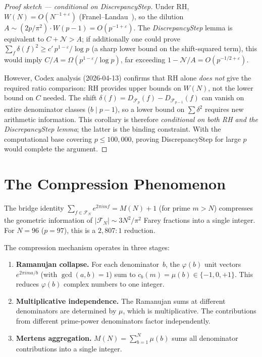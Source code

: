 \documentclass[11pt]{article}
\theoremstyle{definition}
\newcommand{\F}{\mathcal{F}}
\begin{document}
\begin{proof}[Proof sketch — conditional on DiscrepancyStep]
Under RH, $W(N) = O(N^{-1+\varepsilon})$
(Franel--Landau~\cite{Franel1924, Landau1924}), so the dilution
$A \sim (2p/\pi^2)\cdot W(p-1) = O(p^{-1+\varepsilon})$.
The \emph{DiscrepancyStep} lemma is equivalent to
$C + \mathcal{N} > A$; if additionally one could prove
$\sum_{f} \delta(f)^2 \ge c'\,p^{1-\varepsilon}/\log p$
(a sharp lower bound on the shift-squared term), this would imply
$C/A = \Omega(p^{1-\varepsilon}/\log p)$, far exceeding
$1 - \mathcal{N}/A = O(p^{-1/2+\varepsilon})$.

However, Codex analysis (2026-04-13) confirms that RH alone
\emph{does not} give the required ratio comparison: RH provides
upper bounds on $W(N)$, not the lower bound on $C$ needed.
The shift $\delta(f) = D_{\F_p}(f) - D_{\F_{p-1}}(f)$ can vanish
on entire denominator classes ($b \mid p-1$), so a lower bound on
$\sum \delta^2$ requires new arithmetic information.
This corollary is therefore \emph{conditional on both RH and
the DiscrepancyStep lemma}; the latter is the binding constraint.
With the computational base covering $p \le 100{,}000$,
proving DiscrepancyStep for large $p$ would complete the argument.
\end{proof}

\section{The Compression Phenomenon}\label{sec:compression}

The bridge identity $\sum_{f \in \F_N} e^{2\pi imf} = M(N) + 1$
(for prime $m > N$) compresses the geometric information of
$|\F_N| \sim 3N^2/\pi^2$ Farey fractions into a single integer.
For $N = 96$ ($p = 97$), this is a $2{,}807 : 1$ reduction.

The compression mechanism operates in three stages:
\begin{enumerate}
\item \textbf{Ramanujan collapse.}  For each denominator~$b$,
the $\varphi(b)$ unit vectors $e^{2\pi i m a/b}$ (with
$\gcd(a,b) = 1$) sum to $c_b(m) = \mu(b) \in \{-1, 0, +1\}$.
This reduces $\varphi(b)$ complex numbers to one integer.

\item \textbf{Multiplicative independence.}  The Ramanujan sums
at different denominators are determined by $\mu$, which is
multiplicative.  The contributions from different prime-power
denominators factor independently.

\item \textbf{Mertens aggregation.}
$M(N) = \sum_{b=1}^{N} \mu(b)$ sums all denominator
contributions into a single integer.
\end{enumerate}
\end{document}
